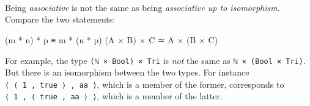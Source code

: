 \begin{fence}
\begin{code}
\AgdaSpace{}%
\AgdaSpace{}%
\AgdaSpace{}%
\AgdaSpace{}%
\AgdaSpace{}%
\AgdaOperator{\AgdaInductiveConstructor{,}}\AgdaSpace{}%
\AgdaSpace{}%
\AgdaSpace{}%
\AgdaOperator{\AgdaInductiveConstructor{,}}\AgdaSpace{}%
\AgdaSpace{}%
\AgdaSpace{}%
\AgdaSymbol{\}}\<%
\\
%
\>[4]\AgdaSymbol{;}\AgdaSpace{}%
\AgdaSpace{}%
\AgdaSymbol{=}\AgdaSpace{}%
\AgdaSpace{}%
\AgdaSpace{}%
\AgdaSpace{}%
\AgdaSpace{}%
\AgdaOperator{\AgdaInductiveConstructor{,}}\AgdaSpace{}%
\AgdaSpace{}%
\AgdaSpace{}%
\AgdaOperator{\AgdaInductiveConstructor{,}}\AgdaSpace{}%
\AgdaSpace{}%
\AgdaSpace{}%
\AgdaSpace{}%
\AgdaSpace{}%
\AgdaSymbol{\}}\<%
\\
%
\>[4]\AgdaSymbol{;}\AgdaSpace{}%
\AgdaSpace{}%
\AgdaSymbol{=}\AgdaSpace{}%
\AgdaSpace{}%
\AgdaSpace{}%
\AgdaSpace{}%
\AgdaOperator{\AgdaInductiveConstructor{,}}\AgdaSpace{}%
\AgdaSpace{}%
\AgdaSpace{}%
\AgdaOperator{\AgdaInductiveConstructor{,}}\AgdaSpace{}%
\AgdaSpace{}%
\AgdaSpace{}%
\AgdaSpace{}%
\AgdaSpace{}%
\AgdaSpace{}%
\AgdaSymbol{\}}\<%
\\
%
\>[4]\AgdaSymbol{\}}\<%
\end{code}
\end{fence}

Being \emph{associative} is not the same as being \emph{associative up
to isomorphism}. Compare the two statements:

\begin{myDisplay}
(m * n) * p ≡ m * (n * p)
(A × B) × C ≃ A × (B × C)
\end{myDisplay}

For example, the type \texttt{(ℕ\ ×\ Bool)\ ×\ Tri} is \emph{not} the
same as \texttt{ℕ\ ×\ (Bool\ ×\ Tri)}. But there is an isomorphism
between the two types. For instance
\texttt{⟨\ ⟨\ 1\ ,\ true\ ⟩\ ,\ aa\ ⟩}, which is a member of the former,
corresponds to \texttt{⟨\ 1\ ,\ ⟨\ true\ ,\ aa\ ⟩\ ⟩}, which is a member
of the latter.

